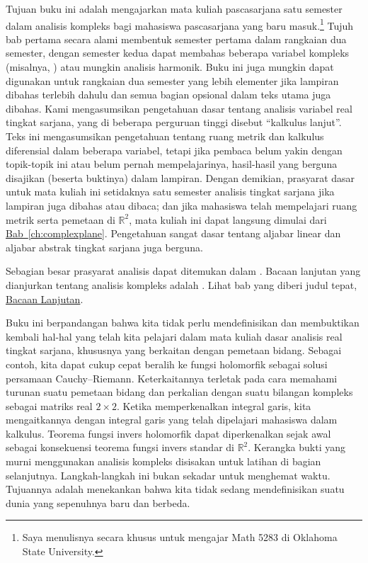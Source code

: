 \documentclass[12pt,openany]{book}
\newcommand{\R}{{\mathbb{R}}}
\newcommand{\myquote}[1]{``#1''}
\theoremstyle{plain}
\theoremstyle{remark}
\theoremstyle{definition}
\theoremstyle{exercise}
\theoremstyle{example}
\newcommand{\Chapterref}[1]{\hyperref[#1]{Bab~\ref*{#1}}}
\begin{document}
Tujuan buku ini adalah mengajarkan mata kuliah pascasarjana satu semester dalam
analisis kompleks bagi mahasiswa pascasarjana yang baru masuk.\footnote{Saya menulisnya
secara khusus untuk mengajar Math 5283 di Oklahoma State University.}
Tujuh bab pertama secara alami membentuk semester pertama dalam rangkaian dua semester, dengan semester
kedua dapat membahas beberapa variabel kompleks (misalnya, \cite{scv:book})
atau mungkin analisis harmonik.
Buku ini juga mungkin dapat digunakan untuk rangkaian dua semester yang lebih elementer jika
lampiran dibahas terlebih dahulu dan semua bagian opsional dalam teks utama
juga dibahas.
Kami mengasumsikan pengetahuan dasar tentang
analisis variabel real tingkat sarjana, yang di beberapa perguruan tinggi disebut \myquote{kalkulus lanjut}.
Teks ini mengasumsikan pengetahuan tentang ruang metrik
dan kalkulus diferensial dalam beberapa variabel, tetapi jika pembaca belum
yakin dengan topik-topik ini atau belum pernah mempelajarinya, hasil-hasil yang berguna
disajikan (beserta buktinya) dalam lampiran.
Dengan demikian, prasyarat dasar untuk
mata kuliah ini setidaknya satu semester analisis tingkat sarjana jika
lampiran juga dibahas atau dibaca; dan jika mahasiswa telah
mempelajari ruang metrik serta pemetaan di $\R^2$, mata kuliah ini
dapat langsung dimulai dari \Chapterref{ch:complexplane}.  Pengetahuan sangat dasar tentang
aljabar linear dan aljabar abstrak tingkat sarjana juga berguna.

Sebagian besar prasyarat analisis dapat ditemukan dalam
\cites{ra:book,ra:book2,Rudin:principles}.  Bacaan lanjutan yang dianjurkan
tentang analisis kompleks adalah \cites{Boas,Conway1,Conway2,Rudin,Ullrich}.
Lihat bab yang diberi judul tepat,
\hyperref[ch:furtherreading]{Bacaan Lanjutan}.

Buku ini berpandangan bahwa kita tidak perlu mendefinisikan dan membuktikan kembali
hal-hal yang telah kita pelajari dalam mata kuliah dasar analisis real tingkat sarjana,
khususnya yang
berkaitan dengan pemetaan bidang.
Sebagai contoh, kita dapat cukup cepat beralih ke
fungsi holomorfik sebagai solusi persamaan Cauchy--Riemann.
Keterkaitannya terletak pada cara memahami turunan
suatu pemetaan bidang dan
perkalian dengan suatu bilangan kompleks
sebagai matriks real $2 \times 2$.
Ketika memperkenalkan integral garis, kita mengaitkannya
dengan integral garis yang telah dipelajari mahasiswa dalam kalkulus.
Teorema fungsi invers holomorfik dapat diperkenalkan sejak awal sebagai
konsekuensi teorema fungsi invers standar di $\R^2$.
Kerangka bukti yang murni menggunakan analisis kompleks disisakan untuk latihan di bagian selanjutnya.
Langkah-langkah ini bukan sekadar untuk menghemat waktu.
Tujuannya adalah menekankan bahwa kita tidak sedang mendefinisikan suatu dunia yang sepenuhnya baru dan
berbeda.
\end{document}
